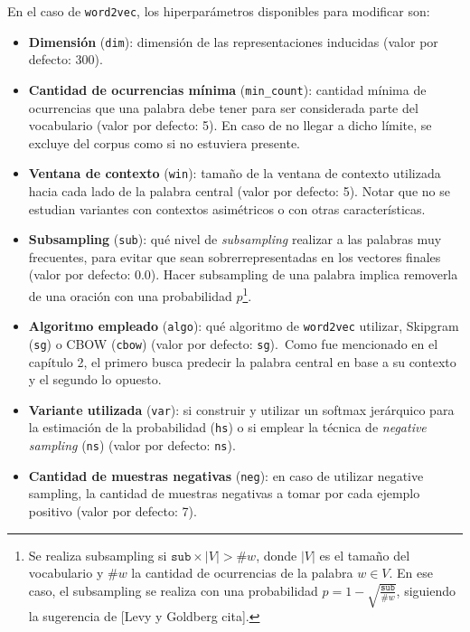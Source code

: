 En el caso de \texttt{word2vec}, los hiperparámetros disponibles para modificar son:

\begin{itemize}

\item \textbf{Dimensión} (\texttt{dim}): dimensión de las representaciones inducidas (valor por
defecto: 300).

\item \textbf{Cantidad de ocurrencias mínima} (\texttt{min\_count}): cantidad mínima de ocurrencias
que una palabra debe tener para ser considerada parte del vocabulario (valor por defecto: 5). En
caso de no llegar a dicho límite, se excluye del corpus como si no estuviera presente.

\item \textbf{Ventana de contexto} (\texttt{win}): tamaño de la ventana de contexto utilizada hacia
cada lado de la palabra central (valor por defecto: 5). Notar que no se estudian variantes con
contextos asimétricos o con otras características.

\item \textbf{Subsampling} (\texttt{sub}): qué nivel de \textit{subsampling} realizar a las palabras
muy frecuentes, para evitar que sean sobrerrepresentadas en los vectores finales (valor por defecto:
0.0). Hacer subsampling de una palabra implica removerla de una oración con una probabilidad
$p$\footnote{Se realiza subsampling si $\mathtt{sub} \times |V| > \#w$, donde $|V|$ es el tamaño del
vocabulario y $\#w$ la cantidad de ocurrencias de la palabra $w \in V$. En ese caso, el subsampling
se realiza con una probabilidad $p = 1 - \sqrt{\frac{\mathtt{sub}}{\#w}}$, siguiendo la sugerencia
de [Levy y Goldberg cita].}.

\item \textbf{Algoritmo empleado} (\texttt{algo}): qué algoritmo de \texttt{word2vec} utilizar,
Skipgram (\texttt{sg}) o CBOW (\texttt{cbow}) (valor por defecto: \texttt{sg}).\ Como fue mencionado
en el capítulo 2, el primero busca predecir la palabra central en base a su contexto y el segundo lo
opuesto.

\item \textbf{Variante utilizada} (\texttt{var}): si construir y utilizar un softmax jerárquico para
la estimación de la probabilidad (\texttt{hs}) o si emplear la técnica de \textit{negative sampling}
(\texttt{ns}) (valor por defecto: \texttt{ns}).

\item \textbf{Cantidad de muestras negativas} (\texttt{neg}): en caso de utilizar negative sampling,
la cantidad de muestras negativas a tomar por cada ejemplo positivo (valor por defecto: 7).


\end{itemize}
